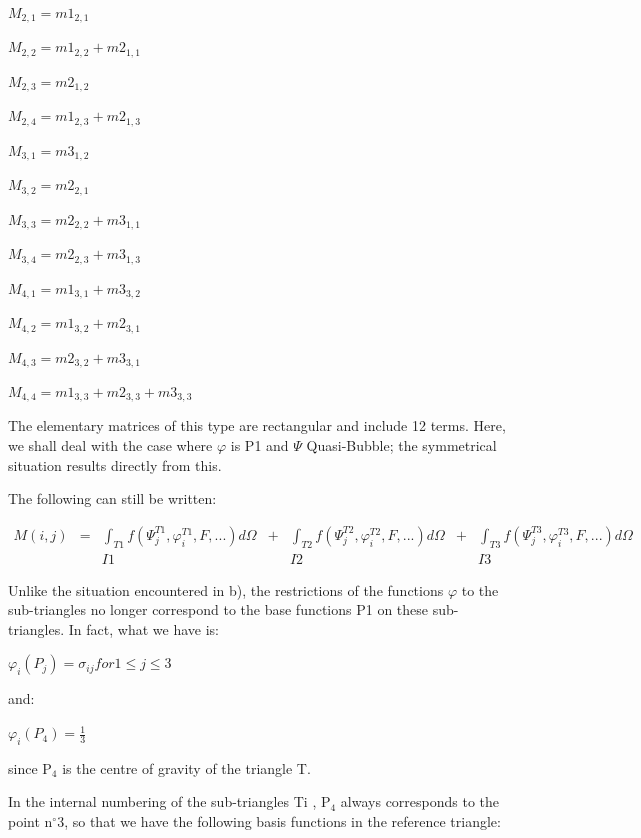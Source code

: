 $M_{2,1} = m1_{2,1}$

$M_{2,2} = m1_{2,2} + m2_{1,1}$

$M_{2,3} = m2_{1,2}$

$M_{2,4} = m1_{2,3} + m2_{1,3}$

$M_{3,1} = m3_{1,2}$

$M_{3,2} = m2_{2,1}$

$M_{3,3} = m2_{2,2} + m3_{1,1}$

$M_{3,4} = m2_{2,3} + m3_{1,3}$

$M_{4,1} = m1_{3,1} + m3_{3,2}$

$M_{4,2} = m1_{3,2} + m2_{3,1}$

$M_{4,3} = m2_{3,2} + m3_{3,1}$

$M_{4,4} = m1_{3,3} + m2_{3,3} + m3_{3,3}$


The elementary matrices of this type are rectangular and include 12 terms.
Here, we shall deal with the case where $\varphi$ is P1 and $\Psi$
Quasi-Bubble; the symmetrical situation results directly from this.

The following can still be written:

\[
\begin{array}{ccccccc}
M(i,j) & = &\int _{T1}f(\Psi _{j}^{T1} ,\varphi _{i}^{T1} ,F,...)d\Omega & + & \int _{T2}f(\Psi _{j}^{T2} ,\varphi _{i}^{T2} ,F,...)d\Omega & + & \int _{T3}f(\Psi _{j}^{T3} ,\varphi _{i}^{T3} ,F,...)d\Omega  \\
       &   &   I1                                                         &   &    I2                                                        &   &   I3
\end{array}
\]

Unlike the situation encountered in b), the restrictions of the functions $\varphi$ to
the sub-triangles no longer correspond to the base functions P1 on these
sub-triangles. In fact, what we have is:

$\varphi_{i}(P_{j})=\sigma _{ij} for 1 \le j \le 3$

and:

$\varphi_{i}(P_{4})=\frac{1}{3}$

since P${}_{4}$ is the centre of gravity of the triangle T.

In the internal numbering of the sub-triangles Ti , P${}_{4}$ always
corresponds to the point n${}^\circ$3, so that we have the following basis
functions in the reference triangle:


